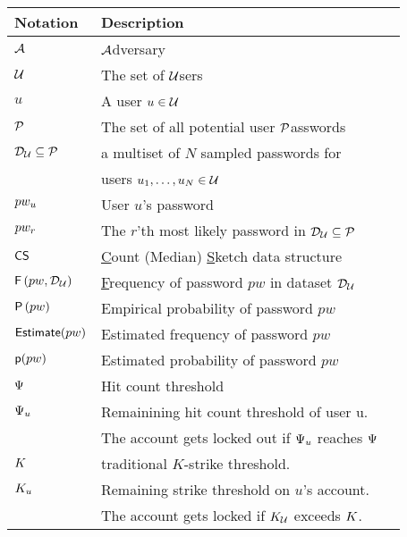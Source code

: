 \begin{table}[htb]
	\begin{tabular}{|l|l|l|}\hline
		Notation      & Description                                                                   \\\hline
		$\mathcal{A}$  & \underline{$\mathcal{A}$}dversary                            \\\hline
		$\mathcal{U}$ & The set of 	{$\mathcal{U}$}sers           \\\hline
		$u$           & A user  $u \in \mathcal{U}$                                                    \\\hline
		$\mathcal{P}$ & The set of all potential user \underline{$\mathcal{P}$}asswords \\\hline
		$\mathcal{D}_{{\mathcal{U}}} \subseteq \mathcal{P}$ & a multiset of $N$ sampled passwords for\\
		& users $u_1,\ldots,u_N \in \mathcal{U}$ \\ \hline
		$pw_{u}$         & User $u$'s password   \\\hline
		$pw_{r}$         & The $r$'th most likely password in $\mathcal{D}_{{\mathcal{U}}} \subseteq \mathcal{P}$ \\\hline
		$\mathsf{CS}$ & \underline{C}ount (Median) \underline{S}ketch data structure\\    \hline    	
		$\mathsf{F}\left(pw, \mathcal{D}_{{\mathcal{U}}}\right)$ & \underline{F}requency of password $pw$ in dataset $\mathcal{D}_{{\mathcal{U}}}$ \\\hline
		$\mathsf{P}\left(pw\right)$ & Empirical probability of password $pw$ \\\hline        
		$\textsf{Estimate}(pw)$ & Estimated frequency of password $pw$\\\hline
		$\textsf{p}(pw)$ & Estimated probability of password $pw$  \\\hline                    
		$\Psi$ & Hit count threshold \\\hline 
		$\Psi_{u}$ & Remainining hit count threshold of user u. \\&The account gets locked out if $\Psi_{u}$ reaches $\Psi$\\\hline
		$K$ & traditional $K$-strike threshold. \\\hline
		$K_{u}$ & Remaining strike threshold on $u$'s account. \\&The account gets locked if $K_{\mathcal{U}}$ exceeds $K$. \\\hline

\end{tabular}
\end{table}
